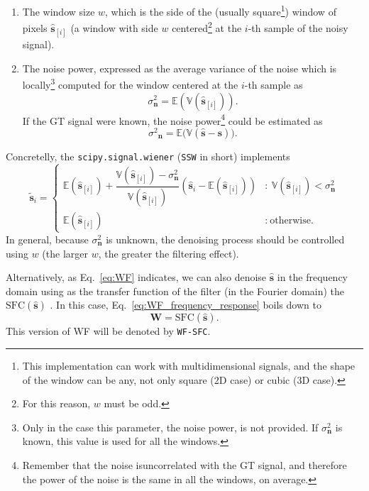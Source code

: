 \begin{enumerate}
\item The window size $w$, which is the side of the (usually
  square\footnote{This implementation can work with multidimensional
    signals, and the shape of the window can be any, not only square
    (2D case) or cubic (3D case).}) window of pixels
  $\hat{\mathbf{s}}_{[i]}$ (a window with side $w$
  centered\footnote{For this reason, $w$ must be odd.} at the $i$-th
  sample of the noisy signal).
\item The noise power, expressed as the average variance of the noise
  which is locally\footnote{Only in the case this parameter, the noise
    power, is not provided. If ${\sigma^2_{\mathbf{n}}}$ is known,
    this value is used for all the windows.} computed for the window
  centered at the $i$-th sample as
  \begin{equation}
    {\sigma^2_{\mathbf{n}}}=\mathbb{E}\left(\mathbb{V}(\hat{\mathbf{s}}_{[i]})\right).
  \end{equation}
  If the \gls{GT} signal were known, the noise power\footnote{Remember that
    the noise isuncorrelated with the GT signal, and therefore the
    power of the noise is the same in all the windows, on average.}
  could be estimated as
  \begin{equation}
    {\sigma^2}_{\mathbf{n}} = \mathbb{E}\big(\mathbb{V}(\hat{\mathbf{s}}-\mathbf{s})\big).
  \end{equation}
\end{enumerate}
Concretelly, the \texttt{scipy.signal.wiener} (\texttt{SSW} in short) implements
\begin{equation}
  \tilde{\mathbf{s}}_i = \left\{
    \begin{array}{ll}
      \mathbb{E}(\hat{\mathbf{s}}_{[i]}) + \dfrac{\mathbb{V}(\hat{\mathbf{s}}_{[i]})-\sigma^2_\mathbf{n}}{\mathbb{V}(\hat{\mathbf{s}}_{[i]})}\left(\hat{\mathbf{s}}_i-\mathbb{E}(\hat{\mathbf{s}}_{[i]})\right) & : \ \mathbb{V}(\hat{\mathbf{s}}_{[i]}) < \sigma^2_\mathbf{n} \\
      \mathbb{E}(\hat{\mathbf{s}}_{[i]}) & : \ \text{otherwise.}
    \end{array} \right.
\end{equation}
In general, because $\sigma^2_{\mathbf{n}}$ is unknown, the denoising
process should be controlled using $w$ (the larger $w$, the greater
the filtering effect).

Alternatively, as Eq.~\ref{eq:WF} indicates, we can also denoise
$\hat{\mathbf{s}}$ in the frequency domain using as the transfer
function of the filter (in the Fourier domain) the
$\text{SFC}(\hat{\mathbf{s}})$ \cite{verbeke2024self}. In this case,
Eq.~\ref{eq:WF_frequency_response} boils down to
\begin{equation}
  \mathbf{W} = \text{SFC}(\hat{\mathbf{s}}).
  \label{eq:WF_SFC}
\end{equation}
This version of \gls{WF} will be denoted by \texttt{WF-SFC}.

\begin{comment}
If the \gls{GT} were known, Eq.~\ref{eq:WF_SFC} becomes
\begin{equation}
  \mathbf{W}(\mathbf{x}) = \text{SFC}(\mathbf{x}).
  \label{eq:WF_SFC*}
\end{equation}
We will refer to this filter as ``Wiener-SFC''.
\end{comment}

